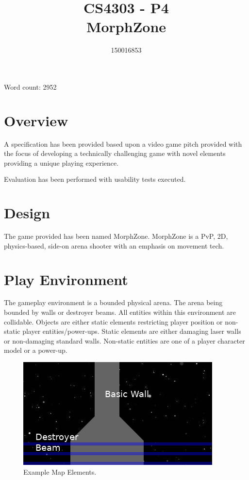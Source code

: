 \documentclass[10pt,a4paper]{article}
\author{150016853}
\title{%
CS4303 - P4\\
MorphZone}
\begin{document}
\maketitle
\begin{center}
Word count: 2952
\end{center}

\section{Overview}

A specification has been provided based upon a video game pitch provided with the focus of developing a technically challenging game with novel elements providing a unique playing experience.

Evaluation has been performed with usability tests executed.

\section{Design}

The game provided has been named MorphZone. MorphZone is a PvP, 2D, physics-based, side-on arena shooter with an emphasis on movement tech.

\section{Play Environment}

The gameplay environment is a bounded physical arena. The arena being bounded by walls or destroyer beams. All entities within this environment are collidable. Objects are either static elements restricting player position or non-static player entities/power-ups. Static elements are either damaging laser walls or non-damaging standard walls. Non-static entities are one of a player character model or a power-up.


\begin{figure}[!h]
\centering
  \includegraphics[width=\linewidth]{map_elements.png}
  \caption{Example Map Elements.}
  \label{fig:boat1}
\end{figure}
\end{document}

